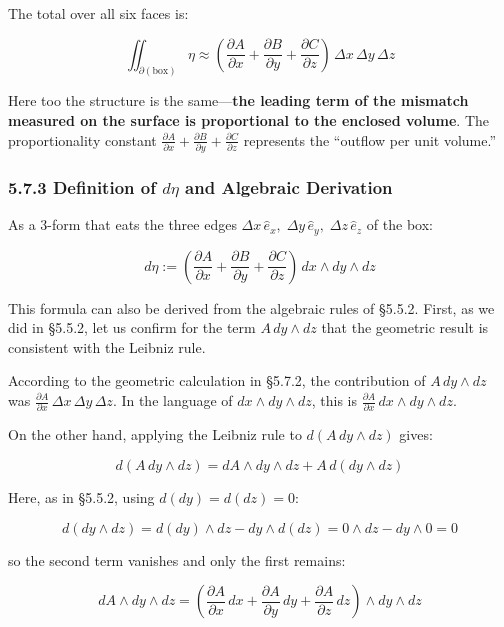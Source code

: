 The total over all six faces is:

\[\iint_{\partial (\text{box})} \eta \approx (\frac{\partial A}{\partial x} + \frac{\partial B}{\partial y} + \frac{\partial C}{\partial z})\,\Delta x\,\Delta y\,\Delta z\]

Here too the structure is the
same---\textbf{the leading term of the mismatch measured on the surface is proportional to the enclosed volume}.
The proportionality constant
\(\frac{\partial A}{\partial x} + \frac{\partial B}{\partial y} + \frac{\partial C}{\partial z}\)
represents the ``outflow per unit volume.''

\hypertarget{definition-of-deta-and-algebraic-derivation}{%
\subsubsection{\texorpdfstring{5.7.3 Definition of \(d\eta\) and
Algebraic
Derivation}{5.7.3 Definition of d\textbackslash eta and Algebraic Derivation}}\label{definition-of-deta-and-algebraic-derivation}}

As a \(3\)-form that eats the three edges
\(\Delta x\,\hat{e}_x,\; \Delta y\,\hat{e}_y,\; \Delta z\,\hat{e}_z\) of
the box:

\[d\eta := (\frac{\partial A}{\partial x} + \frac{\partial B}{\partial y} + \frac{\partial C}{\partial z})\,dx \wedge dy \wedge dz\]

This formula can also be derived from the algebraic rules of §5.5.2.
First, as we did in §5.5.2, let us confirm for the term
\(A\,dy \wedge dz\) that the geometric result is consistent with the
Leibniz rule.

According to the geometric calculation in §5.7.2, the contribution of
\(A\,dy \wedge dz\) was
\(\frac{\partial A}{\partial x}\,\Delta x\,\Delta y\,\Delta z\). In the
language of \(dx \wedge dy \wedge dz\), this is
\(\frac{\partial A}{\partial x}\,dx \wedge dy \wedge dz\).

On the other hand, applying the Leibniz rule to \(d(A\,dy \wedge dz)\)
gives:

\[d(A\,dy \wedge dz) = dA \wedge dy \wedge dz + A\,d(dy \wedge dz)\]

Here, as in §5.5.2, using \(d(dy)=d(dz)=0\):

\[d(dy \wedge dz) = d(dy) \wedge dz - dy \wedge d(dz) = 0 \wedge dz - dy \wedge 0 = 0\]

so the second term vanishes and only the first remains:

\[dA \wedge dy \wedge dz = (\frac{\partial A}{\partial x}\,dx + \frac{\partial A}{\partial y}\,dy + \frac{\partial A}{\partial z}\,dz) \wedge dy \wedge dz\]

